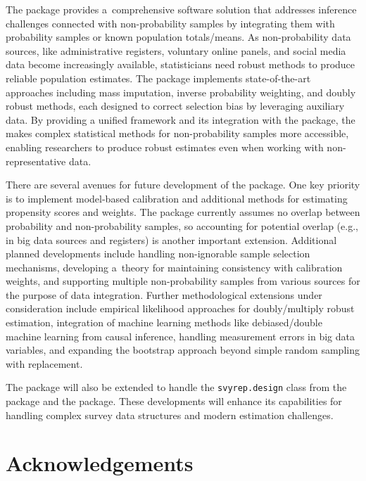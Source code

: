 \documentclass[
]{jss}
\begin{document}
The  package provides a~comprehensive 
software solution that addresses inference challenges connected with
non-probability samples by integrating them with probability samples or
known population totals/means. As non-probability data sources, like
administrative registers, voluntary online panels, and social media data
become increasingly available, statisticians need robust methods to
produce reliable population estimates. The package implements
state-of-the-art approaches including mass imputation, inverse
probability weighting, and doubly robust methods, each designed to
correct selection bias by leveraging auxiliary data. By providing a
unified framework and its integration with the  package, the
 makes complex statistical methods for non-probability
samples more accessible, enabling researchers to produce robust
estimates even when working with non-representative data.

There are several avenues for future development of the 
package. One key priority is to implement model-based calibration and
additional methods for estimating propensity scores and weights. The
package currently assumes no overlap between probability and
non-probability samples, so accounting for potential overlap (e.g., in
big data sources and registers) is another important extension.
Additional planned developments include handling non-ignorable sample
selection mechanisms, developing a~theory for maintaining consistency
with calibration weights, and supporting multiple non-probability
samples from various sources for the purpose of data integration.
Further methodological extensions under consideration include empirical
likelihood approaches for doubly/multiply robust estimation, integration
of machine learning methods like debiased/double machine learning from
causal inference, handling measurement errors in big data variables, and
expanding the bootstrap approach beyond simple random sampling with
replacement.

The package will also be extended to handle the \texttt{svyrep.design}
class from the  package and the  package. These
developments will enhance its capabilities for handling complex survey
data structures and modern estimation challenges.

\section{Acknowledgements}\label{sec-acknowledgements}
\end{document}
